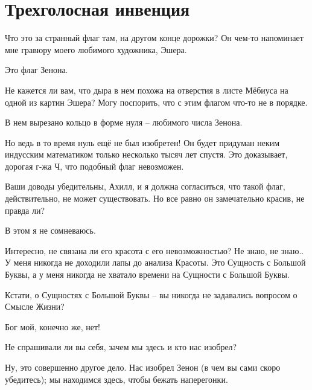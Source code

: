 \documentclass[../main.tex]{subfiles}
\begin{document}
\section{Трехголосная инвенция}


\begin{dialogue}

 Что это за странный флаг там, на другом конце дорожки? Он чем-то напоминает мне гравюру моего любимого художника, Эшера.

 Это флаг Зенона.

 Не кажется ли вам, что дыра в нем похожа на отверстия в листе Мёбиуса на одной из картин Эшера? Могу поспорить, что с этим флагом что-то не в порядке.

 В нем вырезано кольцо в форме нуля \--- любимого числа Зенона.

 Но ведь в то время нуль ещё не был изобретен! Он будет придуман неким индусским математиком только несколько тысяч лет спустя. Это доказывает, дорогая г-жа Ч, что подобный флаг невозможен.

 Ваши доводы убедительны, Ахилл, и я должна согласиться, что такой флаг, действительно, не может существовать. Но все равно он замечательно красив, не правда ли?

 В этом я не сомневаюсь.

 Интересно, не связана ли его красота с его невозможностью? Не знаю, не знаю.. У меня никогда не доходили лапы до анализа Красоты. Это Сущность с Большой Буквы, а у меня никогда не хватало времени на Сущности с Большой Буквы.

 Кстати, о Сущностях с Большой Буквы \--- вы никогда не задавались вопросом о Смысле Жизни?

 Бог мой, конечно же, нет!

 Не спрашивали ли вы себя, зачем мы здесь и кто нас изобрел?

 Ну, это совершенно другое дело. Нас изобрел Зенон (в чем вы сами скоро убедитесь); мы находимся здесь, чтобы бежать наперегонки.


\end{dialogue}
\end{document}
